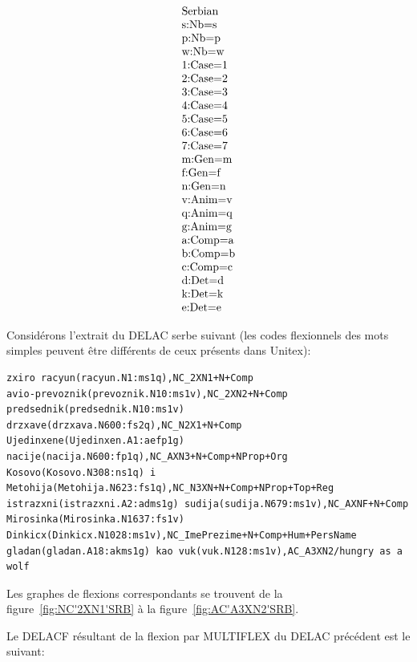 \[
\begin{array}[l]{l}
$Serbian$ \\
$s:Nb=s$ \\
$p:Nb=p$ \\
$w:Nb=w$ \\
$1:Case=1$ \\
$2:Case=2$ \\
$3:Case=3$ \\
$4:Case=4$ \\
$5:Case=5$ \\
$6:Case=6$ \\
$7:Case=7$ \\
$m:Gen=m$ \\
$f:Gen=f$ \\
$n:Gen=n$ \\
$v:Anim=v$ \\
$q:Anim=q$ \\
$g:Anim=g$ \\
$a:Comp=a$ \\
$b:Comp=b$ \\
$c:Comp=c$ \\
$d:Det=d$ \\
$k:Det=k$ \\
$e:Det=e$
\end{array}
\]

\bigskip
\noindent Considérons l'extrait du DELAC serbe suivant (les codes flexionnels des mots simples
peuvent être différents de ceux présents dans Unitex):
\scriptsize
\begin{verbatim}
zxiro racyun(racyun.N1:ms1q),NC_2XN1+N+Comp
avio-prevoznik(prevoznik.N10:ms1v),NC_2XN2+N+Comp
predsednik(predsednik.N10:ms1v) drzxave(drzxava.N600:fs2q),NC_N2X1+N+Comp
Ujedinxene(Ujedinxen.A1:aefp1g) nacije(nacija.N600:fp1q),NC_AXN3+N+Comp+NProp+Org
Kosovo(Kosovo.N308:ns1q) i Metohija(Metohija.N623:fs1q),NC_N3XN+N+Comp+NProp+Top+Reg 
istrazxni(istrazxni.A2:adms1g) sudija(sudija.N679:ms1v),NC_AXNF+N+Comp
Mirosinka(Mirosinka.N1637:fs1v) Dinkicx(Dinkicx.N1028:ms1v),NC_ImePrezime+N+Comp+Hum+PersName
gladan(gladan.A18:akms1g) kao vuk(vuk.N128:ms1v),AC_A3XN2/hungry as a wolf
\end{verbatim}
\normalsize

\bigskip
\noindent Les graphes de flexions correspondants se trouvent de la figure~\ref{fig:NC'2XN1'SRB} à la
figure~\ref{fig:AC'A3XN2'SRB}. 

\bigskip
\noindent Le DELACF résultant de la flexion par MULTIFLEX du DELAC précédent est le suivant:

